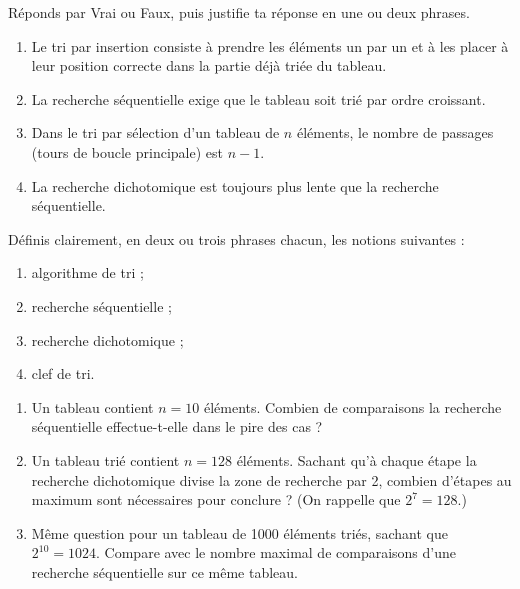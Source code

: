 \documentclass[11pt]{article}
\newcounter{popsec}
\newcounter{popsub}
\newcommand{\courssub}[1]{%
  \stepcounter{popsub}%
  \par\vspace{9pt}\noindent{\popxbold\fontsize{11.5}{13}\selectfont\color{popink}{\color{poporange}\thepopsec.\thepopsub}\hspace{6pt}#1}\par\nopagebreak\vspace{4pt}
}
\begin{document}
\begin{exercice}
Réponds par Vrai ou Faux, puis justifie ta réponse en une ou deux phrases.
\begin{enumerate}
\item Le tri par insertion consiste à prendre les éléments un par un et à les placer à leur position correcte dans la partie déjà triée du tableau.
\item La recherche séquentielle exige que le tableau soit trié par ordre croissant.
\item Dans le tri par sélection d'un tableau de $n$ éléments, le nombre de passages (tours de boucle principale) est $n - 1$.
\item La recherche dichotomique est toujours plus lente que la recherche séquentielle.
\end{enumerate}
\end{exercice}

\begin{exercice}[Définitions]
Définis clairement, en deux ou trois phrases chacun, les notions suivantes :
\begin{enumerate}
\item algorithme de tri ;
\item recherche séquentielle ;
\item recherche dichotomique ;
\item clef de tri.
\end{enumerate}
\end{exercice}

\begin{exercice}
\begin{enumerate}
\item Un tableau contient $n = 10$ éléments. Combien de comparaisons la recherche séquentielle effectue-t-elle dans le pire des cas ?
\item Un tableau trié contient $n = 128$ éléments. Sachant qu'à chaque étape la recherche dichotomique divise la zone de recherche par 2, combien d'étapes au maximum sont nécessaires pour conclure ? (On rappelle que $2^7 = 128$.)
\item Même question pour un tableau de \num{1000} éléments triés, sachant que $2^{10} = \num{1024}$. Compare avec le nombre maximal de comparaisons d'une recherche séquentielle sur ce même tableau.
\end{enumerate}
\end{exercice}

\courssub{Je m'entraîne}
\end{document}
